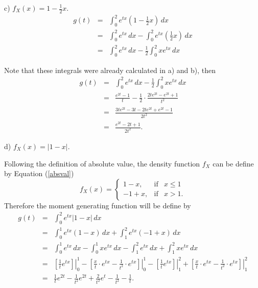 \documentclass[12pt]{article}
\begin{document}
	\noindent c) $f_X (x) = 1 - \frac{1}{2}x$.
	\begin{eqnarray*}
		g(t) &=& \int_{0}^{2} e^{tx} \left( 1 - \frac{1}{2}x \right)\, dx \\
		&=& \int_{0}^{2} e^{tx} \, dx - \int_{0}^{2} e^{tx} \left(\frac{1}{2} x \right)\, dx \\
		&=& \int_{0}^{2} e^{tx} \, dx - \frac{1}{2} \int_{0}^{2} xe^{tx} \, dx 
	\end{eqnarray*}

	Note that these integrals were already calculated in a) and b), then
	\begin{eqnarray*}
		g(t) &=& \int_{0}^{2} e^{tx} \, dx - \frac{1}{2} \int_{0}^{2} xe^{tx} \, dx \\
		&=& \frac{e^{2t}-1}{t} - \frac{1}{2} \cdot \frac{2te^{2t} - e^{2t} + 1}{t^2} \\
		&=& \frac{3te^{2t} - 3t - 2te^{2t} + e^{2t} - 1}{2t^2} \\
		&=& \frac{e^{2t} - 2t + 1}{2t^2}.
	\end{eqnarray*}

	\noindent d) $f_X (x) = |1 - x|$.

	Following the definition of absolute value, the density function $f_X$ can be define by Equation (\ref{absval})
	\begin{equation}
	f_X(x)= \left\{ \begin{array}{lcc}
	1-x, &   \text{if}  & x \leq 1 \\
	-1+x, &  \text{if}  & x > 1.
	\end{array}
	\right.
	\label{absval}
	\end{equation}
	Therefore the moment generating function will be define by %
	\begin{eqnarray*}
		g(t) &=& \int_{0}^{2} e^{tx} |1 - x|\, dx \\
		&=& \int_{0}^{1} e^{tx}(1-x) \, dx + \int_{1}^{2} e^{tx} (-1+x) \, dx \\
		&=& \int_{0}^{1} e^{tx} \, dx - \int_{0}^{1} xe^{tx}\, dx -  \int_{1}^{2} e^{tx} \, dx + \int_{1}^{2} xe^{tx}\, dx \\
		&=& \left. \left[\frac{1}{t} e^{tx}\right] \right|_{0}^{1} - \left. \left[ \frac{x}{t} \cdot e^{tx} - \frac{1}{t^2} \cdot e^{tx}\right] \right|_{0}^{1} - \left. \left[\frac{1}{t} e^{tx}\right] \right|_{1}^{2} + \left. \left[ \frac{x}{t} \cdot e^{tx} - \frac{1}{t^2} \cdot e^{tx}\right] \right|_{1}^{2} \\
		&=& \frac{1}{t} e^{2t} - \frac{1}{t^2}e^{2t} + \frac{2}{t^2} e^t - \frac{1}{t^2} - \frac{1}{t}. 
	\end{eqnarray*}
	
\end{document}
